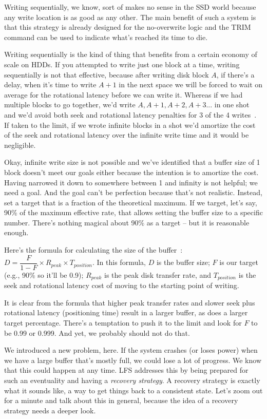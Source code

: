 Writing sequentially, we know, sort of makes no sense in the SSD world because any write location is as good as any other. The main benefit of such a system is that this strategy is already designed for the no-overwrite logic and the TRIM command can be used to indicate what's reached its time to die. 

Writing sequentially is the kind of thing that benefits from a certain economy of scale on HDDs. If you attempted to write just one block at a time, writing sequentially is not that effective, because after writing disk block $A$, if there's a delay, when it's time to write $A+1$ in the next space we will be forced to wait on average for the rotational latency before we can write it. Whereas if we had multiple blocks to go together, we'd write $A, A+1, A+2, A+3...$ in one shot and we'd avoid both seek and rotational latency penalties for 3 of the 4 writes~\cite{OSTEP}. If taken to the limit, if we wrote infinite blocks in a shot we'd amortize the cost of the seek and rotational latency over the infinite write time and it would be negligible.

Okay, infinite write size is not possible and we've identified that a buffer size of 1 block doesn't meet our goals either because the intention is to amortize the cost. Having narrowed it down to somewhere between 1 and infinity is not helpful; we need a goal. And the goal can't be perfection because that's not realistic. Instead, set a target that is a fraction of the theoretical maximum. If we target, let's say, 90\% of the maximum effective rate, that allows setting the buffer size to a specific number. There's nothing magical about 90\% as a target -- but it is reasonable enough. 

Here's the formula for calculating the size of the buffer~\cite{OSTEP}: $D = \dfrac{F}{1-F} \times R_{peak} \times T_{position}$. In this formula, $D$ is the buffer size; $F$ is our target (e.g., 90\% so it'll be 0.9); $R_{peak}$ is the peak disk transfer rate, and $T_{position}$ is the seek and rotational latency cost of moving to the starting point of writing. 

It is clear from the formula that higher peak transfer rates and slower seek plus rotational latency (positioning time) result in a larger buffer, as does a larger target percentage. There's a temptation to push it to the limit and look for $F$ to be 0.99 or 0.999. And yet, we probably should not do that. 

We introduced a new problem, here. If the system crashes (or loses power) when we have a large buffer that's mostly full, we could lose a lot of progress.  We know that this could happen at any time. LFS addresses this by being prepared for such an eventuality and having a \textit{recovery strategy}. A recovery strategy is exactly what it sounds like, a way to get things back to a consistent state. Let's zoom out for a minute and talk about this in general,  because the idea of a recovery strategy needs a deeper look.

